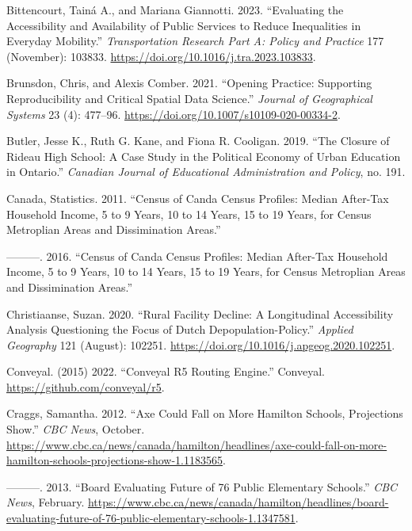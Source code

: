 \documentclass[
default
]{sn-jnl}
\newlength{\cslhangindent}
\newenvironment{CSLReferences}[2] %
 {\begin{list}{}{%
  \setlength{\itemindent}{0pt}
  \setlength{\leftmargin}{0pt}
  \setlength{\parsep}{0pt}
  \ifodd #1
   \setlength{\leftmargin}{\cslhangindent}
   \setlength{\itemindent}{-1\cslhangindent}
  \fi
  \setlength{\itemsep}{#2\baselineskip}}}
 {\end{list}}
\begin{document}
\begin{CSLReferences}{1}{0}
Bittencourt, Tainá A., and Mariana Giannotti. 2023. {``Evaluating the
Accessibility and Availability of Public Services to Reduce Inequalities
in Everyday Mobility.''} \emph{Transportation Research Part A: Policy
and Practice} 177 (November): 103833.
\url{https://doi.org/10.1016/j.tra.2023.103833}.

Brunsdon, Chris, and Alexis Comber. 2021. {``Opening Practice:
Supporting Reproducibility and Critical Spatial Data Science.''}
\emph{Journal of Geographical Systems} 23 (4): 477--96.
\url{https://doi.org/10.1007/s10109-020-00334-2}.

Butler, Jesse K., Ruth G. Kane, and Fiona R. Cooligan. 2019. {``The
{Closure} of {Rideau High School}: {A Case Study} in the {Political
Economy} of {Urban Education} in {Ontario}.''} \emph{Canadian Journal of
Educational Administration and Policy}, no. 191.

Canada, Statistics. 2011. {``Census of Canda Census Profiles: Median
After-Tax Household Income, 5 to 9 Years, 10 to 14 Years, 15 to 19
Years, for Census Metroplian Areas and Dissimination Areas.''}

---------. 2016. {``Census of Canda Census Profiles: Median After-Tax
Household Income, 5 to 9 Years, 10 to 14 Years, 15 to 19 Years, for
Census Metroplian Areas and Dissimination Areas.''}

Christiaanse, Suzan. 2020. {``Rural Facility Decline: A Longitudinal
Accessibility Analysis Questioning the Focus of Dutch
Depopulation-Policy.''} \emph{Applied Geography} 121 (August): 102251.
\url{https://doi.org/10.1016/j.apgeog.2020.102251}.

Conveyal. (2015) 2022. {``Conveyal {R5 Routing Engine}.''} {Conveyal}.
\url{https://github.com/conveyal/r5}.

Craggs, Samantha. 2012. {``Axe Could Fall on More Hamilton Schools,
Projections Show.''} \emph{{CBC} News}, October.
\url{https://www.cbc.ca/news/canada/hamilton/headlines/axe-could-fall-on-more-hamilton-schools-projections-show-1.1183565}.

---------. 2013. {``Board Evaluating Future of 76 Public Elementary
Schools.''} \emph{{CBC} News}, February.
\url{https://www.cbc.ca/news/canada/hamilton/headlines/board-evaluating-future-of-76-public-elementary-schools-1.1347581}.


\end{CSLReferences}
\end{document}
